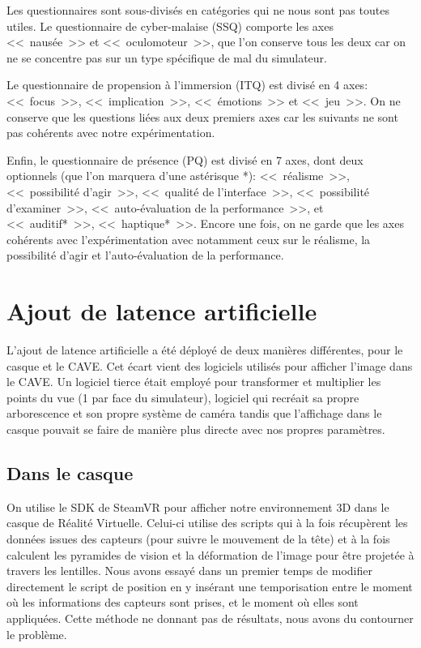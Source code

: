 	\par Les questionnaires sont sous-divisés en catégories qui ne nous sont pas toutes utiles. Le questionnaire de cyber-malaise (SSQ) comporte les axes <<~nausée~>> et <<~oculomoteur~>>, que l'on conserve tous les deux car on ne se concentre pas sur un type spécifique de mal du simulateur.
	
	\par Le questionnaire de propension à l'immersion (ITQ) est divisé en 4 axes: <<~focus~>>, <<~implication~>>, <<~émotions~>> et <<~jeu~>>. On ne conserve que les questions liées aux deux premiers axes car les suivants ne sont pas cohérents avec notre expérimentation.
	
	\par Enfin, le questionnaire de présence (PQ) est divisé en 7 axes, dont deux optionnels (que l'on marquera d'une astérisque *): <<~réalisme~>>, <<~possibilité d'agir~>>, <<~qualité de l'interface~>>, <<~possibilité d'examiner~>>, <<~auto-évaluation de la performance~>>, et <<~auditif*~>>, <<~haptique*~>>. Encore une fois, on ne garde que les axes cohérents avec l'expérimentation avec notamment ceux sur le réalisme, la possibilité d'agir et l'auto-évaluation de la performance.
		
	\section{Ajout de latence artificielle}
	\label{sec:ajout_latence_artificielle}
	\par L'ajout de latence artificielle a été déployé de deux manières différentes, pour le casque et le CAVE. Cet écart vient des logiciels utilisés pour afficher l'image dans le CAVE. Un logiciel tierce était employé pour transformer et multiplier les points du vue (1 par face du simulateur), logiciel qui recréait sa propre arborescence et son propre système de caméra tandis que l'affichage dans le casque pouvait se faire de manière plus directe avec nos propres paramètres.
	
	\subsection{Dans le casque}
	\par On utilise le SDK de SteamVR pour afficher notre environnement 3D dans le casque de Réalité Virtuelle. Celui-ci utilise des scripts qui à la fois récupèrent les données issues des capteurs (pour suivre le mouvement de la tête) et à la fois calculent les pyramides de vision et la déformation de l'image pour être projetée à travers les lentilles. Nous avons essayé dans un premier temps de modifier directement le script de position en y insérant une temporisation entre le moment où les informations des capteurs sont prises, et le moment où elles sont appliquées. Cette méthode ne donnant pas de résultats, nous avons du contourner le problème.
	
